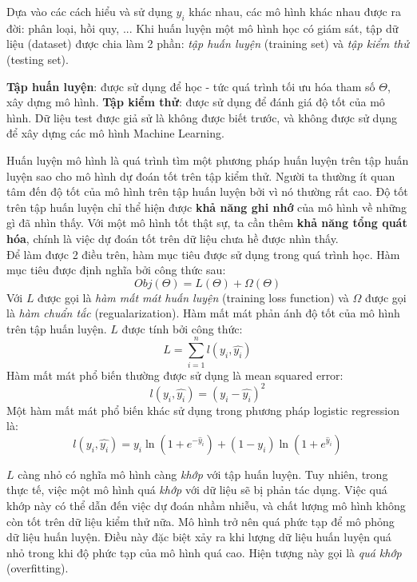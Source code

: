 Dựa vào các cách hiểu và sử dụng $y_i$ khác nhau, các mô hình khác nhau được ra đời: phân loại, hồi quy, ... Khi huấn luyện một mô hình học có giám sát,  tập dữ liệu (dataset) được chia làm 2 phần: \textit{tập huấn luyện} (training set) và \textit{tập kiểm thử} (testing set).
\begin{itemize}
\ii  \textbf{Tập huấn luyện}: được sử dụng để học - tức quá trình tối ưu hóa tham số $\Theta$, xây dựng mô hình.
\ii \textbf{Tập kiểm thử}: được sử dụng để đánh giá độ tốt của mô hình. Dữ liệu test được giả sử là không được biết trước, và không được sử dụng để xây dựng các mô hình Machine Learning.
\end{itemize}
\indent Huấn luyện mô hình là quá trình tìm một phương pháp huấn luyện trên tập huấn luyện sao cho mô hình dự đoán tốt trên tập kiểm thử. Người ta thường ít quan tâm đến độ tốt của mô hình trên tập huấn luyện bởi vì nó thường rất cao. Độ tốt trên tập huấn luyện chỉ thể hiện được \textbf{khả năng ghi nhớ} của mô hình về những gì đã nhìn thấy. Với một mô hình tốt thật sự, ta cần thêm \textbf{khả năng tổng quát hóa}, chính là việc dự đoán tốt trên dữ liệu chưa hề được nhìn thấy. \\
\indent Để làm được 2 điều trên, hàm mục tiêu được sử dụng trong quá trình học. Hàm mục tiêu được định nghĩa bởi công thức sau:
\begin{equation}
    Obj(\Theta) = L(\Theta) + \Omega(\Theta)
\end{equation}
Với $L$ được gọi là \textit{hàm mất mát huấn luyện} (training loss function) và $\Omega$ được gọi là \textit{hàm chuẩn tắc} (regualarization). Hàm mất mát phản ánh độ tốt của mô hình trên tập huấn luyện. $L$ được tính bởi công thức:
\begin{equation}
    L = \sum_{i=1}^{n} l(y_i,\hat{y_i})
\end{equation}
 Hàm mất mát phổ biến thường được sử dụng là mean squared error:
\begin{equation}
l(y_i, \hat{y_i}) = (y_i - \hat{y_i})^2
\end{equation}
Một hàm mất mát phổ biến khác sử dụng trong phương pháp logistic regression là:
\begin{equation}
l(y_i, \hat{y_i}) =  y_i\ln (1+e^{-\hat{y}_i}) + (1-y_i)\ln (1+e^{\hat{y}_i})
\end{equation}

$L$ càng nhỏ có nghĩa mô hình càng \textit{khớp} với tập huấn luyện. Tuy nhiên, trong thực tế, việc một mô hình quá \textit{khớp} với dữ liệu sẽ bị phản tác dụng. Việc quá khớp này có thể dẫn đến việc dự đoán nhầm nhiễu, và chất lượng mô hình không còn tốt trên dữ liệu kiểm thử nữa. Mô hình trở nên quá phức tạp để mô phỏng dữ liệu huấn luyện. Điều này đặc biệt xảy ra khi lượng dữ liệu huấn luyện quá nhỏ trong khi độ phức tạp của mô hình quá cao. Hiện tượng này gọi là \textit{quá khớp} (overfitting). \\

